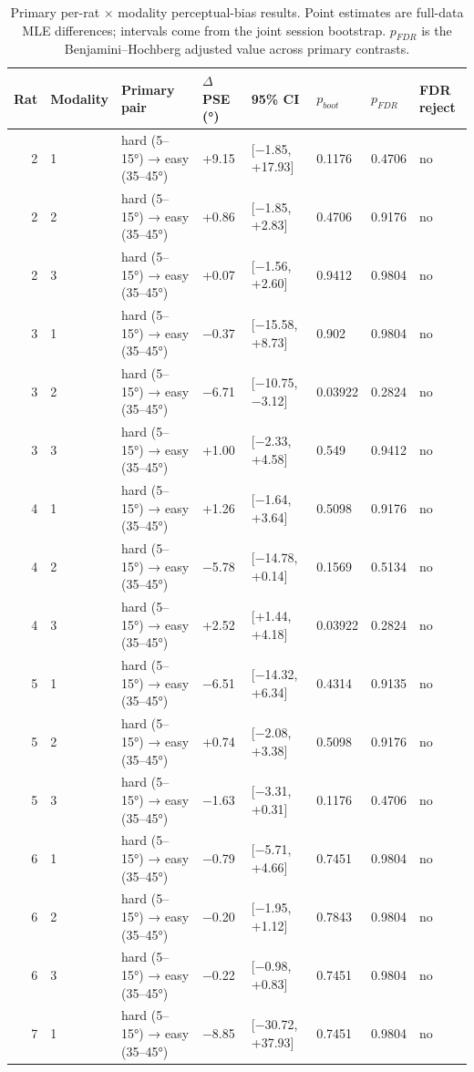 \begin{table}[htbp]
  \centering
  \caption{Primary per-rat $\times$ modality perceptual-bias results. Point estimates are full-data MLE differences; intervals come from the joint session bootstrap. $p_{FDR}$ is the Benjamini--Hochberg adjusted value across primary contrasts.}
  \label{tab:perceptual_bias_summary}
  \begin{tabular}{rlllllll}
    \toprule
    Rat & Modality & Primary pair & $\Delta$PSE (°) & 95\% CI & $p_{boot}$ & $p_{FDR}$ & FDR reject \\
    \midrule
    2 & 1 & hard (5–15°) → easy (35–45°) & +9.15 & [−1.85, +17.93] & 0.1176 & 0.4706 & no \\
    2 & 2 & hard (5–15°) → easy (35–45°) & +0.86 & [−1.85, +2.83] & 0.4706 & 0.9176 & no \\
    2 & 3 & hard (5–15°) → easy (35–45°) & +0.07 & [−1.56, +2.60] & 0.9412 & 0.9804 & no \\
    3 & 1 & hard (5–15°) → easy (35–45°) & −0.37 & [−15.58, +8.73] & 0.902 & 0.9804 & no \\
    3 & 2 & hard (5–15°) → easy (35–45°) & −6.71 & [−10.75, −3.12] & 0.03922 & 0.2824 & no \\
    3 & 3 & hard (5–15°) → easy (35–45°) & +1.00 & [−2.33, +4.58] & 0.549 & 0.9412 & no \\
    4 & 1 & hard (5–15°) → easy (35–45°) & +1.26 & [−1.64, +3.64] & 0.5098 & 0.9176 & no \\
    4 & 2 & hard (5–15°) → easy (35–45°) & −5.78 & [−14.78, +0.14] & 0.1569 & 0.5134 & no \\
    4 & 3 & hard (5–15°) → easy (35–45°) & +2.52 & [+1.44, +4.18] & 0.03922 & 0.2824 & no \\
    5 & 1 & hard (5–15°) → easy (35–45°) & −6.51 & [−14.32, +6.34] & 0.4314 & 0.9135 & no \\
    5 & 2 & hard (5–15°) → easy (35–45°) & +0.74 & [−2.08, +3.38] & 0.5098 & 0.9176 & no \\
    5 & 3 & hard (5–15°) → easy (35–45°) & −1.63 & [−3.31, +0.31] & 0.1176 & 0.4706 & no \\
    6 & 1 & hard (5–15°) → easy (35–45°) & −0.79 & [−5.71, +4.66] & 0.7451 & 0.9804 & no \\
    6 & 2 & hard (5–15°) → easy (35–45°) & −0.20 & [−1.95, +1.12] & 0.7843 & 0.9804 & no \\
    6 & 3 & hard (5–15°) → easy (35–45°) & −0.22 & [−0.98, +0.83] & 0.7451 & 0.9804 & no \\
    7 & 1 & hard (5–15°) → easy (35–45°) & −8.85 & [−30.72, +37.93] & 0.7451 & 0.9804 & no \\

\end{tabular}
\end{table}
